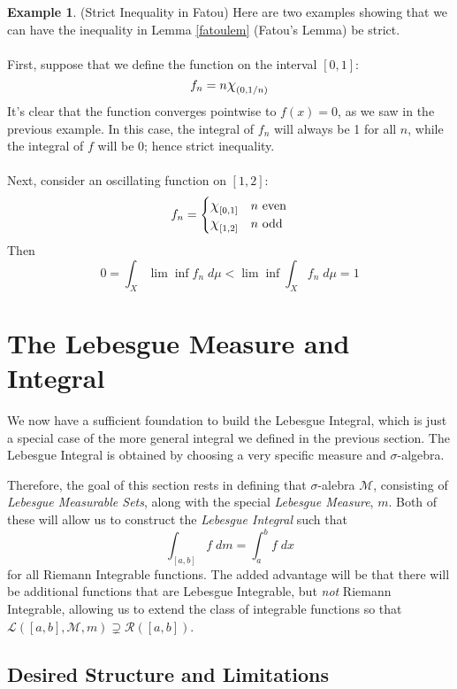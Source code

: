 \documentclass[12pt]{article}
\theoremstyle{plain}
\theoremstyle{definition}
\newtheorem{ex}[thm]{Example}
\theoremstyle{remark}
\newcommand*{\Chi}{\mbox{\large$\chi$}} %
\begin{document}
\begin{ex} (Strict Inequality in Fatou) Here are two examples showing that we can have the inequality in Lemma \ref{fatoulem} (Fatou's Lemma) be strict.
\\
\\
First, suppose that we define the function on the interval $[0,1]$:
\[
    f_n = n \Chi_{(0,1/n)}
\]
It's clear that the function converges pointwise to $f(x)=0$, as we saw in the previous example. In this case, the integral of $f_n$ will always be 1 for all $n$, while the integral of $f$ will be 0; hence strict inequality.
\\
\\
Next, consider an oscillating function on $[1,2]$:
\[
    f_n = 
    \begin{cases}
        \Chi_{[0,1]} & \text{$n$ even} \\
        \Chi_{[1,2]} & \text{$n$ odd} \\
    \end{cases}
\]
Then
\[
    0 = \int_X \lim \inf f_n \; d\mu
    <  \lim \inf\int_X f_n \; d\mu = 1
\]
\end{ex}




\newpage
\section{The Lebesgue Measure and Integral}

We now have a sufficient foundation to build the Lebesgue Integral, which is just a special case of the more general integral we defined in the previous section. The Lebesgue Integral is obtained by choosing a very specific measure and $\sigma$-algebra.

Therefore, the goal of this section rests in defining that $\sigma$-alebra $\mathscr{M}$, consisting of \emph{Lebesgue Measurable Sets}, along with the special \emph{Lebesgue Measure}, $m$. Both of these will allow us to construct the \emph{Lebesgue Integral} such that
\[
    \int_{[a,b]} f \; dm = \int_a^b f \; dx
\]
for all Riemann Integrable functions. The added advantage will be that there will be additional functions that are Lebesgue Integrable, but \emph{not} Riemann Integrable, allowing us to extend the class of integrable functions so that $\mathscr{L}([a,b],\mathscr{M},m) \supsetneq \mathscr{R}([a,b])$. 



\subsection{Desired Structure and Limitations}
\end{document}
